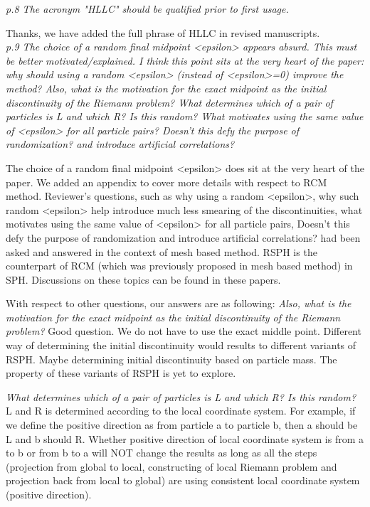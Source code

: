 \documentclass[10pt,a4paper]{article}
\begin{document}
\textit{p.8 The acronym "HLLC" should be qualified prior to first usage.}

Thanks, we have added the full phrase of HLLC in revised manuscripts.
\\[3pt]

\textit{p.9 The choice of a random final midpoint <epsilon> appears absurd. This must be better motivated/explained. I think this point sits at the very heart of the paper: why should using a random <epsilon> (instead of <epsilon>=0) improve the method?
Also, what is the motivation for the exact midpoint as the initial discontinuity of the Riemann problem? What determines which of a pair of particles is L and which R? Is this random? What motivates using the same value of <epsilon> for all particle pairs? Doesn't this defy the purpose of randomization? and introduce artificial correlations?}

The choice of a random final midpoint <epsilon> does sit at the very heart of the paper. We added an appendix to cover more details with respect to RCM method. Reviewer's questions, such as why using a random <epsilon>, why such random <epsilon> help introduce much less smearing of the discontinuities, what motivates using the same value of <epsilon> for all particle pairs, Doesn't this defy the purpose of randomization and introduce artificial correlations? had been asked and answered in the context of mesh based method. RSPH is the counterpart of RCM (which was previously proposed in mesh based method) in SPH. Discussions on these topics can be found in these papers. 

With respect to other questions, our answers are as following: 
\textit{Also, what is the motivation for the exact midpoint as the initial discontinuity of the Riemann problem?}
Good question. We do not have to use the exact middle point. Different way of determining the initial discontinuity would results to different variants of RSPH. Maybe determining initial discontinuity based on particle mass. The property of these variants of RSPH is yet to explore. 

\textit{ What determines which of a pair of particles is L and which R? Is this random? }
L and R is determined according to the local coordinate system. For example, if we define the positive direction as from particle a to particle b, then a should be L and b should R. Whether positive direction of local coordinate system is from a to b or from b to a will NOT change the results as long as all the steps (projection from global to local, constructing of local Riemann problem and projection back from local to global) are using consistent local coordinate system (positive direction).
\\[3pt]
\end{document}
